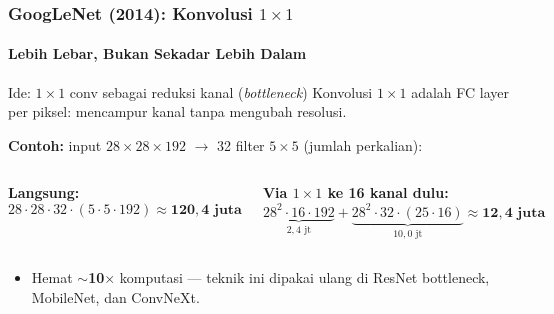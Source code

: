 \documentclass[t,aspectratio=169,xcolor=dvipsnames]{beamer}
\begin{document}
\begin{frame}
    \frametitle{GoogLeNet (2014): Konvolusi $1\times1$}
    \framesubtitle{Lebih Lebar, Bukan Sekadar Lebih Dalam}
    \footnotesize

    \begin{block}{Ide: $1\times1$ conv sebagai reduksi kanal (\textit{bottleneck})}
        Konvolusi $1\times1$ adalah FC layer per piksel: mencampur kanal tanpa mengubah resolusi.
    \end{block}

    \textbf{Contoh:} input $28\times28\times192$ $\to$ 32 filter $5\times5$ (jumlah perkalian):
    \begin{columns}[T]
        \textbf{Langsung:}
        $$28\cdot28\cdot32\cdot(5\cdot5\cdot192) \approx \mathbf{120{,}4\text{ juta}}$$

        \textbf{Via $1\times1$ ke 16 kanal dulu:}
        $$\underbrace{28^2\cdot16\cdot192}_{2{,}4\text{ jt}} + \underbrace{28^2\cdot32\cdot(25\cdot16)}_{10{,}0\text{ jt}} \approx \mathbf{12{,}4\text{ juta}}$$
    \end{columns}

    \vspace{0.2cm}
    \begin{itemize}
        \item Hemat \textbf{$\sim$10$\times$} komputasi --- teknik ini dipakai ulang di ResNet bottleneck, MobileNet, dan ConvNeXt.
    \end{itemize}
\end{frame}
\end{document}
